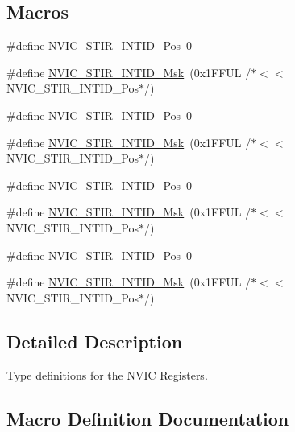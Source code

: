 \subsection*{Macros}
\begin{DoxyCompactItemize}
\item 
\#define \hyperlink{group__CMSIS__NVIC_ga9eebe495e2e48d302211108837a2b3e8}{N\+V\+I\+C\+\_\+\+S\+T\+I\+R\+\_\+\+I\+N\+T\+I\+D\+\_\+\+Pos}~0
\item 
\#define \hyperlink{group__CMSIS__NVIC_gae4060c4dfcebb08871ca4244176ce752}{N\+V\+I\+C\+\_\+\+S\+T\+I\+R\+\_\+\+I\+N\+T\+I\+D\+\_\+\+Msk}~(0x1\+F\+F\+U\+L /$\ast$$<$$<$ N\+V\+I\+C\+\_\+\+S\+T\+I\+R\+\_\+\+I\+N\+T\+I\+D\+\_\+\+Pos$\ast$/)
\item 
\#define \hyperlink{group__CMSIS__NVIC_ga9eebe495e2e48d302211108837a2b3e8}{N\+V\+I\+C\+\_\+\+S\+T\+I\+R\+\_\+\+I\+N\+T\+I\+D\+\_\+\+Pos}~0
\item 
\#define \hyperlink{group__CMSIS__NVIC_gae4060c4dfcebb08871ca4244176ce752}{N\+V\+I\+C\+\_\+\+S\+T\+I\+R\+\_\+\+I\+N\+T\+I\+D\+\_\+\+Msk}~(0x1\+F\+F\+U\+L /$\ast$$<$$<$ N\+V\+I\+C\+\_\+\+S\+T\+I\+R\+\_\+\+I\+N\+T\+I\+D\+\_\+\+Pos$\ast$/)
\item 
\#define \hyperlink{group__CMSIS__NVIC_ga9eebe495e2e48d302211108837a2b3e8}{N\+V\+I\+C\+\_\+\+S\+T\+I\+R\+\_\+\+I\+N\+T\+I\+D\+\_\+\+Pos}~0
\item 
\#define \hyperlink{group__CMSIS__NVIC_gae4060c4dfcebb08871ca4244176ce752}{N\+V\+I\+C\+\_\+\+S\+T\+I\+R\+\_\+\+I\+N\+T\+I\+D\+\_\+\+Msk}~(0x1\+F\+F\+U\+L /$\ast$$<$$<$ N\+V\+I\+C\+\_\+\+S\+T\+I\+R\+\_\+\+I\+N\+T\+I\+D\+\_\+\+Pos$\ast$/)
\item 
\#define \hyperlink{group__CMSIS__NVIC_ga9eebe495e2e48d302211108837a2b3e8}{N\+V\+I\+C\+\_\+\+S\+T\+I\+R\+\_\+\+I\+N\+T\+I\+D\+\_\+\+Pos}~0
\item 
\#define \hyperlink{group__CMSIS__NVIC_gae4060c4dfcebb08871ca4244176ce752}{N\+V\+I\+C\+\_\+\+S\+T\+I\+R\+\_\+\+I\+N\+T\+I\+D\+\_\+\+Msk}~(0x1\+F\+F\+U\+L /$\ast$$<$$<$ N\+V\+I\+C\+\_\+\+S\+T\+I\+R\+\_\+\+I\+N\+T\+I\+D\+\_\+\+Pos$\ast$/)
\end{DoxyCompactItemize}


\subsection{Detailed Description}
Type definitions for the N\+V\+IC Registers. 



\subsection{Macro Definition Documentation}
